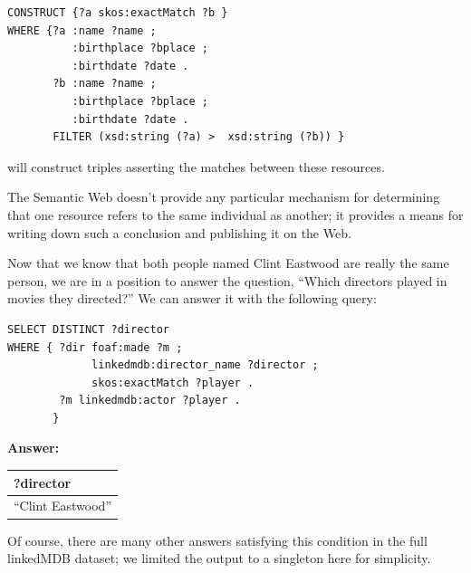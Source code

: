\begin{challenge}
\begin{lstlisting}
CONSTRUCT {?a skos:exactMatch ?b }
WHERE {?a :name ?name ;
          :birthplace ?bplace ;
          :birthdate ?date .
       ?b :name ?name ;
          :birthplace ?bplace ;
          :birthdate ?date .
       FILTER (xsd:string (?a) >  xsd:string (?b)) }
\end{lstlisting}

will construct triples asserting the matches between these resources.

The Semantic Web doesn't provide any particular mechanism for
determining that one resource refers to the same individual as another;
it provides a means for writing down such a conclusion and publishing it
on the Web.

Now that we know that both people named Clint Eastwood are really the
same person, we are in a position to answer the question, ``Which
directors played in movies they directed?'' We can answer it with the
following query:

\begin{lstlisting}
SELECT DISTINCT ?director
WHERE { ?dir foaf:made ?m ;
             linkedmdb:director_name ?director ;
             skos:exactMatch ?player . 
        ?m linkedmdb:actor ?player .
       }
\end{lstlisting}

\textbf{\textbf{Answer:}}

\begin{tabular}{|l|}
\hline
?director\\
\hline
``Clint Eastwood''\\
\hline
\end{tabular}
\end{challenge}

Of course, there are many other answers satisfying this condition in the full 
linkedMDB dataset; we limited the output to a singleton here for simplicity. 

